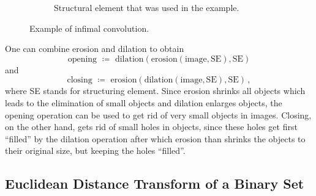 \begin{figure}[htpb]
\begin{subfigure}[b]{0.3\textwidth}
    \caption{Structural element that was used in the example.}
  \end{subfigure}%
  \label{fig:tropconv}%
  \caption{Example of infimal convolution.}%
\end{figure}
 One can combine erosion
and dilation to obtain
\begin{equation*}
  \text{opening } \coloneqq \text{ dilation}(\text{erosion}(\text{image},\text{SE}),\text{SE}) 
\end{equation*}
and
\begin{equation*}
  \text{closing } \coloneqq \text{ erosion}(\text{dilation}(\text{image},\text{SE}),\text{SE})\,,
\end{equation*}
where SE stands for structuring element. Since erosion shrinks all objects which
leads to the elimination of small objects and dilation enlarges objects, the
opening operation can be used to get rid of very small objects in
images. Closing, on the other hand, gets rid of small holes in objects, since
these holes get first ``filled'' by the dilation operation after which erosion
than shrinks the objects to their original size, but keeping the holes
``filled''.

\subsection*{Euclidean Distance Transform of a Binary Set}

